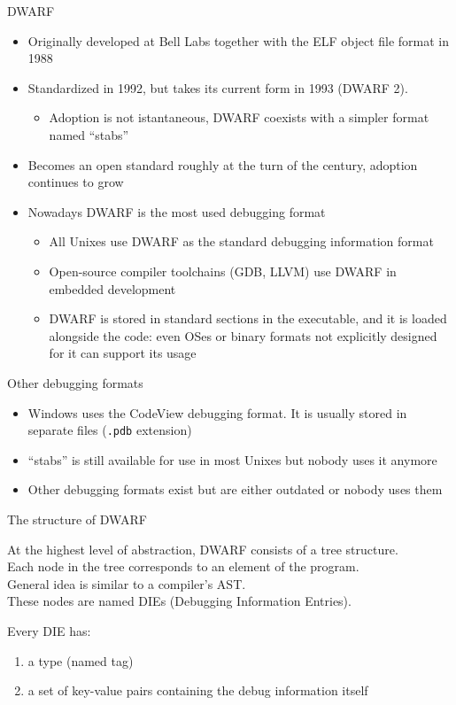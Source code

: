 \begin{frame}{DWARF}
\begin{itemize}
\item Originally developed at Bell Labs together with the ELF object file format in 1988
\item Standardized in 1992, but takes its current form in 1993 (DWARF 2).
	\begin{itemize}
	\item Adoption is not istantaneous, DWARF coexists with a simpler format named ``stabs''
	\end{itemize}
\item Becomes an open standard roughly at the turn of the century, adoption continues to grow
\item Nowadays DWARF is the most used debugging format
	\begin{itemize}
	\item All Unixes use DWARF as the standard debugging information format
	\item Open-source compiler toolchains (GDB, LLVM) use DWARF in embedded development
	\item DWARF is stored in standard sections in the executable, and it is loaded 
		alongside the code: even OSes or binary formats
		not explicitly designed for it can support its usage
	\end{itemize}
\end{itemize}
\end{frame}


\begin{frame}{Other debugging formats}
\begin{itemize}
\item Windows uses the CodeView debugging format. It is usually stored in separate files (\texttt{.pdb} extension)
\item ``stabs'' is still available for use in most Unixes but nobody uses it anymore
\item Other debugging formats exist but are either outdated or nobody uses them
\end{itemize}
\end{frame}


\begin{frame}{The structure of DWARF}
\begin{center}
At the highest level of abstraction, DWARF consists of a \alert{tree} structure.\\
\medskip
Each \alert{node} in the tree corresponds to an element of the program.\\
{\small General idea is similar to a compiler's AST.}\\
\smallskip
These nodes are named \alert{DIEs} (Debugging Information Entries).\\
\end{center}

\bigskip
Every DIE has:
\begin{enumerate}
\item a \alert{type} (named \alert{tag})
\item a set of \alert{key-value} pairs containing the debug information itself
\end{enumerate}
\end{frame}


